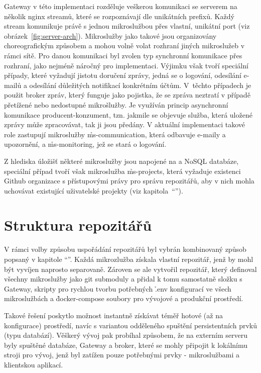 Gateway v této implementaci rozděluje veškerou komunikaci se serverem na několik nginx streamů, které se rozpoznávají dle unikátních  prefixů.
Každý stream komunikuje právě s jednou mikroslužbou přes vlastní, unikátní port (viz obrázek~\ref{fig:server-arch}).
Mikroslužby jako takové jsou organizovány choreografickým způsobem a mohou volně volat rozhraní jiných mikroslužeb v rámci sítě.
Pro danou komunikaci byl zvolen typ synchronní komunikace přes  rozhraní, jako nejméně náročný pro implementaci.
Výjimku však tvoří speciální případy, které vyžadují jistotu doručení zprávy, jedná se o logování, odesílání e-mailů a odesílání důležitých notifikací konkrétním účtům.
V~těchto případech je použit broker zpráv, který funguje jako pojistka, že se zpráva neztratí v případě přetížené nebo nedostupné mikrošlužby.
Je využíván princip asynchronní komunikace producent-konzument, tzn.
jakmile se objevuje služba, která uložené zprávy může zpracovávat, tak ji jsou předány.
V aktuální implementaci takové role zastupují mikroslužby \h{ms-communication}, která odbavuje e-maily a upozornění, a \h{ms-monitoring}, jež se stará o logování.

Z hlediska úložišť některé mikroslužby jsou napojené na  a NoSQL databáze, speciální případ tvoří však mikroslužba \h{ms-projects}, která vyžaduje existenci Github organizace s přístupovými právy pro správu repozitářů, aby v nich mohla uchovávat existující uživatelské projekty (viz kapitola~\enquote{}).



\section{Struktura repozitářů}\label{sec:repository-structure}

V rámci volby způsobu uspořádání repozitářů byl vybrán kombinovaný způsob popsaný v kapitole \enquote{}.
Každá mikrozlužba získala vlastní repozitář, jenž by mohl být vyvíjen naprosto separovaně.
Zároven se ale vytvořil repozitář, který definoval všechny mikroslužby jako git submoduly a přidal k tomu samostatně složku s Gateway, skripty pro rychlou tvorbu potřebných \h{.env} konfigurací ve všech mikroslužbách a \h{docker-compose} soubory pro vývojové a produkční prostředí.

Takové řešení poskytlo možnost instantně získávat téměř hotové (až na konfigurace) prostředí, navíc s variantou odděleného spuštění persistentních prvků (typu databází).
Věškerý vývoj  pak probíhal způsobem, že na externím serveru byly spuštěné databáze, Gateway a broker, které se mohly připojit k lokálnímu stroji pro vývoj, jenž byl zatížen pouze potřebnými prvky - mikroslužbami a klientskou aplikací.



